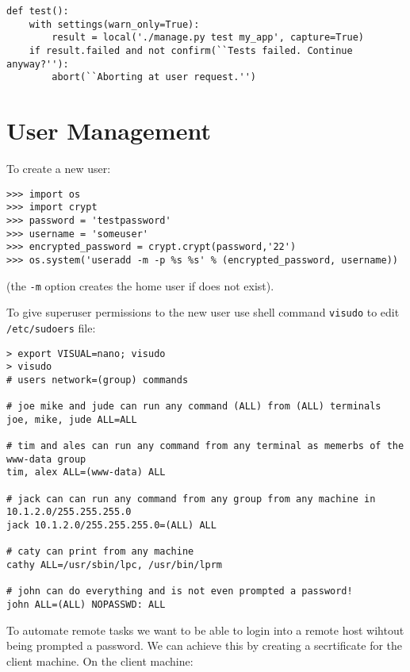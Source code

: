 \documentclass[justified,sixbynine]{tufte-book}
\def\ft{\small\tt}
\theoremstyle{plain}%
\theoremstyle{definition}
\theoremstyle{remark}
\begin{document}
\begin{fullwidth}
\begin{lstlisting}
def test():
    with settings(warn_only=True):
        result = local('./manage.py test my_app', capture=True)
    if result.failed and not confirm(``Tests failed. Continue anyway?''):
        abort(``Aborting at user request.'')
\end{lstlisting}

\goodbreak\chapter{User Management}

To create a new user:

\begin{lstlisting}
>>> import os
>>> import crypt
>>> password = 'testpassword'
>>> username = 'someuser'
>>> encrypted_password = crypt.crypt(password,'22')
>>> os.system('useradd -m -p %s %s' % (encrypted_password, username))
\end{lstlisting}
(the {\ft -m} option creates the home user if does not exist).

To give superuser permissions to the new user use shell command {\ft visudo} to edit {\ft /etc/sudoers} file:
\begin{lstlisting}
> export VISUAL=nano; visudo
> visudo
# users network=(group) commands

# joe mike and jude can run any command (ALL) from (ALL) terminals
joe, mike, jude ALL=ALL

# tim and ales can run any command from any terminal as memerbs of the www-data group
tim, alex ALL=(www-data) ALL

# jack can can run any command from any group from any machine in 10.1.2.0/255.255.255.0
jack 10.1.2.0/255.255.255.0=(ALL) ALL

# caty can print from any machine
cathy ALL=/usr/sbin/lpc, /usr/bin/lprm

# john can do everything and is not even prompted a password!
john ALL=(ALL) NOPASSWD: ALL
\end{lstlisting}

To automate remote tasks we want to be able to login into a remote host wihtout being prompted a password.
We can achieve this by creating a secrtificate for the client machine.
On the client machine:


\end{fullwidth}
\end{document}

